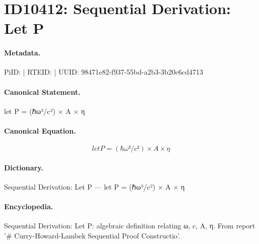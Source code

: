 \section*{ID10412: Sequential Derivation: Let P}
\paragraph{Metadata.}
PiID:  | RTEID:  | UUID: 98471e82-f937-55bd-a2b3-3b20c6cd4713

\paragraph{Canonical Statement.}
let P = (ℏω³/c²) × A × η

\paragraph{Canonical Equation.}
\[
let P = (ℏω³/c²) × A × η
\]

\paragraph{Dictionary.}
Sequential Derivation: Let P — let P = (ℏω³/c²) × A × η

\paragraph{Encyclopedia.}
Sequential Derivation: Let P: algebraic definition relating ω, c, A, η. From report '\# Curry-Howard-Lambek Sequential Proof Constructio'.
